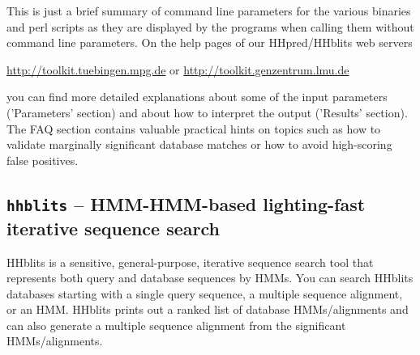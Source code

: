\documentclass[11pt,a4paper]{article}
\begin{document}
This is just a brief summary of command line parameters for the various binaries and
perl scripts as they are displayed by the programs when calling them without 
command line parameters. On the help pages of our HHpred/HHblits web servers

\url{http://toolkit.tuebingen.mpg.de} or \url{http://toolkit.genzentrum.lmu.de}

you can find more detailed explanations about some of the input parameters 
('Parameters' section) and about how to interpret the output ('Results' section). The FAQ 
section contains valuable practical hints on topics such as how to validate marginally
significant database matches or how to avoid high-scoring false positives.


\subsection{{\tt hhblits} -- HMM-HMM-based lighting-fast iterative sequence search}

HHblits is a sensitive, general-purpose, iterative sequence search tool that represents 
both query and database sequences by HMMs. You can search HHblits databases starting
with a single query sequence, a multiple sequence alignment, or an HMM. HHblits prints out
a ranked list of database HMMs/alignments and can also generate a multiple sequence alignment
from the significant HMMs/alignments.
\end{document}
